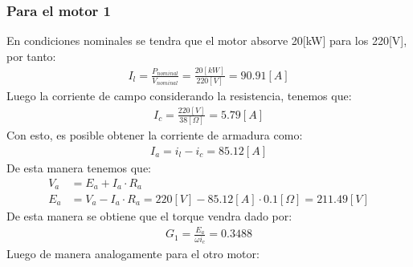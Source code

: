 \documentclass[
  11pt,
  letterpaper,
   addpoints,
   answers
  ]{exam}
\begin{document}
\begin{questions}
\begin{solution}
   \subsubsection*{Para el motor 1}
   En condiciones nominales se tendra que el motor absorve 20[kW] para los 220[V], por tanto:
   \begin{align}
        I_{l} = \frac{P_{nominal}}{V_{nominal}} = \frac{20[kW]}{220[V]} = 90.91[A]
   \end{align}
   Luego la corriente de campo considerando la resistencia, tenemos que:
   \begin{align}
        I_{c} = \frac{220[V]}{38[\Omega]} = 5.79[A]
   \end{align}
   Con esto, es posible obtener la corriente de armadura como:
   \begin{align}
        I_{a} = i_{l} - i_{c} = 85.12[A] 
   \end{align}
   De esta manera tenemos que:
   \begin{align}
        V_{a} &= E_{a} + I_{a} \cdot R_{a}\\
        E_{a} &= V_{a} - I_{a} \cdot R_{a} = 220[V] - 85.12[A] \cdot 0.1[\Omega] = 211.49[V] 
   \end{align}
   De esta manera se obtiene que el torque vendra dado por:
   \begin{align}
       G_{1}= \frac{E_{a}}{\omega i_{c} } =0.3488 
   \end{align}
   Luego de manera analogamente para el otro motor:

\end{solution}
\end{questions}
\end{document}
